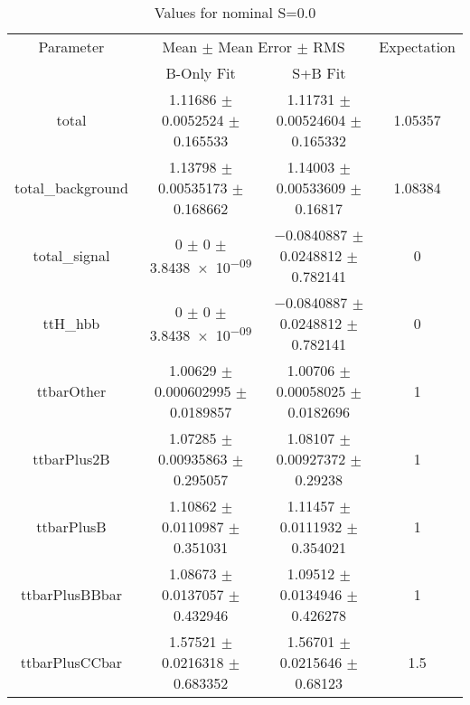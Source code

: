\begin{table}
\centering
\caption{Values for nominal S=0.0}
\begin{tabular}{cccc}
\toprule
Parameter & \multicolumn{2}{c}{Mean $\pm$ Mean Error $\pm$ RMS} & Expectation\\
 & B-Only Fit & S+B Fit & \\
\midrule
total & \num{1.11686} $\pm$ \num{0.0052524} $\pm$ \num{0.165533} & \num{1.11731} $\pm$ \num{0.00524604} $\pm$ \num{0.165332} & \num{1.05357}\\
total\_background & \num{1.13798} $\pm$ \num{0.00535173} $\pm$ \num{0.168662} & \num{1.14003} $\pm$ \num{0.00533609} $\pm$ \num{0.16817} & \num{1.08384}\\
total\_signal & \num{0} $\pm$ \num{0} $\pm$ \num{3.8438e-09} & \num{-0.0840887} $\pm$ \num{0.0248812} $\pm$ \num{0.782141} & \num{0}\\
ttH\_hbb & \num{0} $\pm$ \num{0} $\pm$ \num{3.8438e-09} & \num{-0.0840887} $\pm$ \num{0.0248812} $\pm$ \num{0.782141} & \num{0}\\
ttbarOther & \num{1.00629} $\pm$ \num{0.000602995} $\pm$ \num{0.0189857} & \num{1.00706} $\pm$ \num{0.00058025} $\pm$ \num{0.0182696} & \num{1}\\
ttbarPlus2B & \num{1.07285} $\pm$ \num{0.00935863} $\pm$ \num{0.295057} & \num{1.08107} $\pm$ \num{0.00927372} $\pm$ \num{0.29238} & \num{1}\\
ttbarPlusB & \num{1.10862} $\pm$ \num{0.0110987} $\pm$ \num{0.351031} & \num{1.11457} $\pm$ \num{0.0111932} $\pm$ \num{0.354021} & \num{1}\\
ttbarPlusBBbar & \num{1.08673} $\pm$ \num{0.0137057} $\pm$ \num{0.432946} & \num{1.09512} $\pm$ \num{0.0134946} $\pm$ \num{0.426278} & \num{1}\\
ttbarPlusCCbar & \num{1.57521} $\pm$ \num{0.0216318} $\pm$ \num{0.683352} & \num{1.56701} $\pm$ \num{0.0215646} $\pm$ \num{0.68123} & \num{1.5}\\
\bottomrule
\end{tabular}
\end{table}
